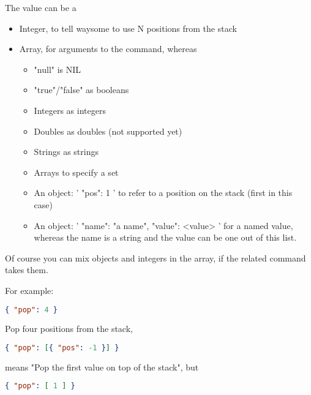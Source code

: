         The value can be a

        \begin{itemize}
            \item Integer, to tell waysome to use N positions from the stack

            \item Array, for arguments to the command, whereas

            \begin{itemize}
                \item "null" is NIL
                \item "true"/"false" as booleans
                \item Integers as integers
                \item Doubles as doubles (not supported yet)
                \item Strings as strings
                \item Arrays to specify a set
                \item An object: '{ "pos": 1 }' to refer to a position on the
                    stack (first in this case)
                \item An object: '{ "name": "a name", "value": <value> }' for a
                    named value, whereas the name is a string and the value can
                    be one out of this list.
            \end{itemize}
        \end{itemize}

        Of course you can mix objects and integers in the array, if the related
        command takes them.

        For example:

        \begin{lstlisting}[language=json]
            { "pop": 4 }
        \end{lstlisting}

        Pop four positions from the stack,

        \begin{lstlisting}[language=json]
            { "pop": [{ "pos": -1 }] }
        \end{lstlisting}

        means "Pop the first value on top of the stack", but

        \begin{lstlisting}[language=json]
            { "pop": [ 1 ] }
        \end{lstlisting}

